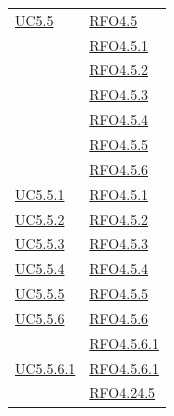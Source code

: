 \begin{itemize}
\begin{itemize}
\begin{itemize}
\begin{itemize}
\begin{longtable}{|>{\centering}m{5cm}|m{5cm}<{\centering}|}
\hyperref[UC5.5]{UC5.5} & \hyperlink{RFO4.5}{RFO4.5}\\
& \hyperlink{RFO4.5.1}{RFO4.5.1}\\
& \hyperlink{RFO4.5.2}{RFO4.5.2}\\
& \hyperlink{RFO4.5.3}{RFO4.5.3}\\
& \hyperlink{RFO4.5.4}{RFO4.5.4}\\
& \hyperlink{RFO4.5.5}{RFO4.5.5}\\
& \hyperlink{RFO4.5.6}{RFO4.5.6}\\ \hline
\hyperref[UC5.5.1]{UC5.5.1} & \hyperlink{RFO4.5.1}{RFO4.5.1}\\ \hline
\hyperref[UC5.5.2]{UC5.5.2} & \hyperlink{RFO4.5.2}{RFO4.5.2}\\ \hline
\hyperref[UC5.5.3]{UC5.5.3} & \hyperlink{RFO4.5.3}{RFO4.5.3}\\ \hline
\hyperref[UC5.5.4]{UC5.5.4} & \hyperlink{RFO4.5.4}{RFO4.5.4}\\ \hline
\hyperref[UC5.5.5]{UC5.5.5} & \hyperlink{RFO4.5.5}{RFO4.5.5}\\ \hline
\hyperref[UC5.5.6]{UC5.5.6} & \hyperlink{RFO4.5.6}{RFO4.5.6}\\
& \hyperlink{RFO4.5.6.1}{RFO4.5.6.1}\\ \hline
\hyperref[UC5.5.6.1]{UC5.5.6.1} & \hyperlink{RFO4.5.6.1}{RFO4.5.6.1}\\ & \hyperlink{RFO4.24.5}{RFO4.24.5}\\ \hline


\end{longtable}
\end{itemize}
\end{itemize}
\end{itemize}
\end{itemize}

